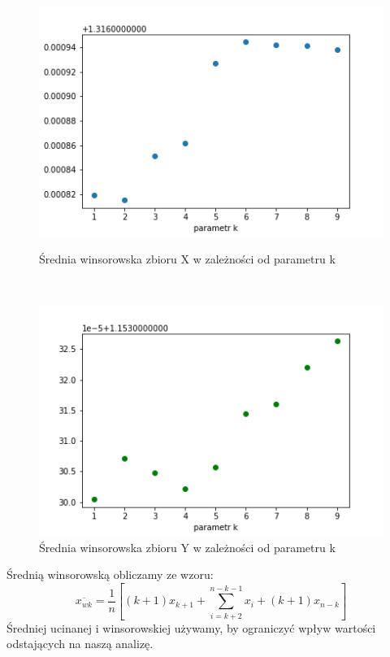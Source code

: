 \documentclass[12pt]{mwart}
\begin{document}
\begin{figure}[H]
	\begin{minipage}{.5\linewidth}
		\centering
		\includegraphics[scale=0.7]{X_wins.PNG}
		\caption{Średnia winsorowska zbioru X w zależności od parametru k}
	\end{minipage}
	$\quad$
	\begin{minipage}{.5\linewidth}
		\centering
		\includegraphics[scale=0.7]{Y_wins.PNG}
		\caption{Średnia winsorowska zbioru Y w zależności od parametru k}
	\end{minipage}
\end{figure}
\noindent Średnią winsorowską obliczamy ze wzoru: 
\begin{equation}
	\overline{x_{wk}} = \frac{1}{n}\left[(k+1)x_{k+1}+\sum\limits_{i=k+2}^{n-k-1}x_i + (k+1)x_{n-k}\right]	
\end{equation}
Średniej ucinanej i winsorowskiej używamy, by ograniczyć wpływ wartości odstających na naszą analizę.
\end{document}
